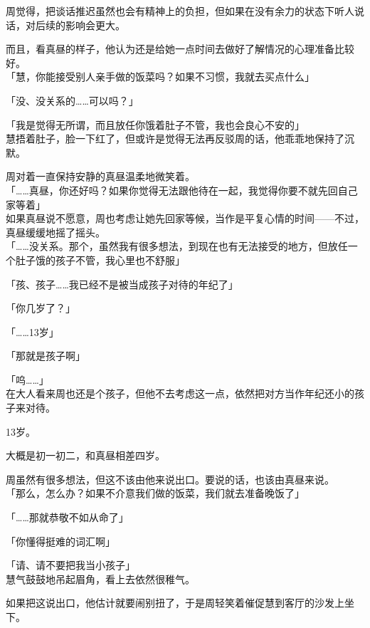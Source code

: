 周觉得，把谈话推迟虽然也会有精神上的负担，但如果在没有余力的状态下听人说话，对后续的影响会更大。

而且，看真昼的样子，他认为还是给她一点时间去做好了解情况的心理准备比较好。\\

「慧，你能接受别人亲手做的饭菜吗？如果不习惯，我就去买点什么」

「没、没关系的……可以吗？」

「我是觉得无所谓，而且放任你饿着肚子不管，我也会良心不安的」\\

慧捂着肚子，脸一下红了，但或许是觉得无法再反驳周的话，他乖乖地保持了沉默。

周对着一直保持安静的真昼温柔地微笑着。\\

「……真昼，你还好吗？如果你觉得无法跟他待在一起，我觉得你要不就先回自己家等着」\\

如果真昼说不愿意，周也考虑让她先回家等候，当作是平复心情的时间——不过，真昼缓缓地摇了摇头。\\

「……没关系。那个，虽然我有很多想法，到现在也有无法接受的地方，但放任一个肚子饿的孩子不管，我心里也不舒服」

「孩、孩子……我已经不是被当成孩子对待的年纪了」

「你几岁了？」

「……13岁」

「那就是孩子啊」

「呜……」\\

在大人看来周也还是个孩子，但他不去考虑这一点，依然把对方当作年纪还小的孩子来对待。

13岁。

大概是初一初二，和真昼相差四岁。

周虽然有很多想法，但这不该由他来说出口。要说的话，也该由真昼来说。\\

「那么，怎么办？如果不介意我们做的饭菜，我们就去准备晚饭了」

「……那就恭敬不如从命了」

「你懂得挺难的词汇啊」

「请、请不要把我当小孩子」\\

慧气鼓鼓地吊起眉角，看上去依然很稚气。

如果把这说出口，他估计就要闹别扭了，于是周轻笑着催促慧到客厅的沙发上坐下。

